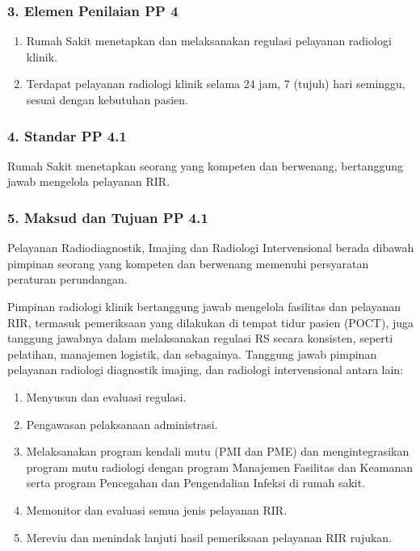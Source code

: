 \documentclass[
]{book}
\providecommand{\tightlist}{%
  \setlength{\itemsep}{0pt}\setlength{\parskip}{0pt}}
\begin{document}
\hypertarget{elemen-penilaian-pp-4}{%
\subsubsection*{3. Elemen Penilaian PP 4}\label{elemen-penilaian-pp-4}}

\begin{enumerate}
\def\labelenumi{\alph{enumi}.}
\tightlist
\item
  Rumah Sakit menetapkan dan melaksanakan regulasi pelayanan radiologi klinik.
\item
  Terdapat pelayanan radiologi klinik selama 24 jam, 7 (tujuh) hari seminggu, sesuai dengan kebutuhan pasien.
\end{enumerate}

\hypertarget{standar-pp-4.1}{%
\subsubsection*{4. Standar PP 4.1}\label{standar-pp-4.1}}

Rumah Sakit menetapkan seorang yang kompeten dan berwenang, bertanggung jawab mengelola pelayanan RIR.

\hypertarget{maksud-dan-tujuan-pp-4.1}{%
\subsubsection*{5. Maksud dan Tujuan PP 4.1}\label{maksud-dan-tujuan-pp-4.1}}

Pelayanan Radiodiagnostik, Imajing dan Radiologi Intervensional berada dibawah pimpinan seorang yang kompeten dan berwenang memenuhi persyaratan peraturan perundangan.

Pimpinan radiologi klinik bertanggung jawab mengelola fasilitas dan pelayanan RIR, termasuk pemeriksaan yang dilakukan di tempat tidur pasien (POCT), juga tanggung jawabnya dalam melaksanakan regulasi RS secara konsisten, seperti pelatihan, manajemen logistik, dan sebagainya.
Tanggung jawab pimpinan pelayanan radiologi diagnostik imajing, dan radiologi intervensional antara lain:

\begin{enumerate}
\def\labelenumi{\alph{enumi}.}
\tightlist
\item
  Menyusun dan evaluasi regulasi.
\item
  Pengawasan pelaksanaan administrasi.
\item
  Melaksanakan program kendali mutu (PMI dan PME) dan mengintegrasikan program mutu radiologi dengan program Manajemen Fasilitas dan Keamanan serta program Pencegahan dan Pengendalian Infeksi di rumah sakit.
\item
  Memonitor dan evaluasi semua jenis pelayanan RIR.
\item
  Mereviu dan menindak lanjuti hasil pemeriksaan pelayanan RIR rujukan.
\end{enumerate}
\end{document}
